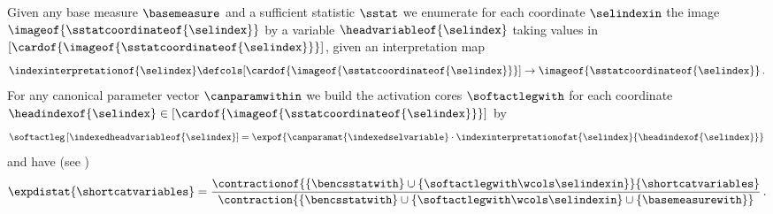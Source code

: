 \begin{theorem}
    \label{the:expFamilyTensorRep}
    Given any base measure $\basemeasure$ and a sufficient statistic $\sstat$ we enumerate for each coordinate $\selindexin$ the image $\imageof{\sstatcoordinateof{\selindex}}$ by a variable $\headvariableof{\selindex}$ taking values in $[\cardof{\imageof{\sstatcoordinateof{\selindex}}}]$, given an interpretation map
    \begin{align*}
        \indexinterpretationof{\selindex} \defcols
        [\cardof{\imageof{\sstatcoordinateof{\selindex}}}] \rightarrow \imageof{\sstatcoordinateof{\selindex}} \, .
    \end{align*}
    For any canonical parameter vector $\canparamwithin$ we build the activation cores $\softactlegwith$ for each coordinate $\headindexof{\selindex}\in[\cardof{\imageof{\sstatcoordinateof{\selindex}}}]$ by
    \begin{align*}
        \softactleg\left[\indexedheadvariableof{\selindex}\right]
        = \expof{\canparamat{\indexedselvariable} \cdot \indexinterpretationofat{\selindex}{\headindexof{\selindex}} } \,
    \end{align*}
    and have (see )
    \begin{align*}
        \expdistat{\shortcatvariables}
        = \frac{
            \contractionof{\{\bencsstatwith\}\cup\{\softactlegwith \wcols \selindexin\}}{\shortcatvariables}
        }{
            \contraction{\{\bencsstatwith\}\cup\{\softactlegwith \wcols \selindexin\}\cup\{\basemeasurewith\}}
        } \, .
    \end{align*}
\end{theorem}

